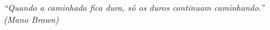 \begin{epigrafe}
	\vspace*{\fill}
	\begin{flushright}
		\textit{``Quando a caminhada fica dura, só os duros continuam caminhando.''\\
			(Mano Brown)}
	\end{flushright}
\end{epigrafe}
